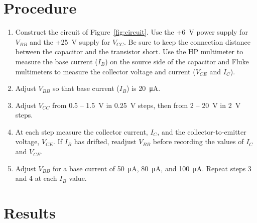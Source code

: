
\section{Procedure}
\label{sec:procedure}

\begin{enumerate}
\item Construct the circuit of Figure~\ref{fig:circuit}.  Use the +\SI{6}{V} power supply for $V_{BB}$ and the +\SI{25}{V} supply for $V_{CC}$.  Be sure to keep the connection distance between the capacitor and the transistor short.  Use the HP multimeter to measure the base current ($I_B$) on the source side of the capacitor and Fluke multimeters to measure the collector voltage and current ($V_{CE}$ and $I_C$).

\item Adjust $V_{BB}$ so that base current ($I_B$) is \SI{20}{\micro\ampere}.

\item Adjust $V_{CC}$ from 0.5 -- \SI{1.5}{V} in \SI{0.25}{V} steps, then from 2 -- \SI{20}{V} in \SI{2}{V} steps.

\item At each step measure the collector current, $I_C$, and the collector-to-emitter voltage,
$V_{CE}$.  If $I_B$ has drifted, readjust $V_{BB}$ before recording the values of $I_C$ and $V_{CE}$.

\item Adjust $V_{BB}$ for a base current of \SI{50}{\micro\ampere}, \SI{80}{\micro\ampere}, and \SI{100}{\micro\ampere}.  Repeat steps 3 and 4 at each $I_B$ value.
\end{enumerate}

\section{Results}

